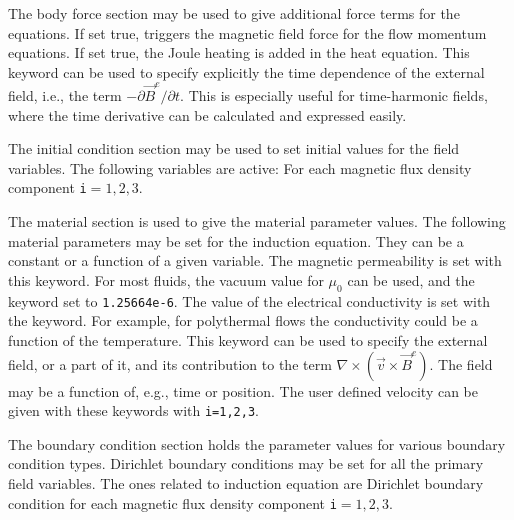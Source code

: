 The body force section may be used to give additional force terms for the equations.
\sifbegin
{} If set true, triggers the magnetic
field force for the flow momentum equations.
 If set true, the Joule heating is added in the
heat equation.
 This keyword can be used to specify
explicitly the time dependence of the external field, i.e., the term
$-\partial\vec{B}^e/\partial t$. This is especially useful for time-harmonic
fields, where the time derivative can be calculated and expressed easily.
\sifend

The initial condition section may be used to set initial values for the field
variables. The following variables are active:
\sifbegin
{} 
For each magnetic flux density component {\tt i}$=1,2,3$.
\sifend

The material section is used to give the material parameter values. The
following material parameters may be set for the induction equation. They can
be a constant or a function of a given variable.
\sifbegin
{} The magnetic permeability is set with
this keyword. For most fluids, the vacuum value for $\mu_0$ can be used,
and the keyword set to {\tt 1.25664e-6}.
 The value of the electrical
conductivity is set with the keyword. For example, for polythermal flows the
conductivity could be a function of the temperature.
 This keyword can be used to specify
the external field, or a part of it, and its contribution to the term
$\nabla\times(\vec{v}\times \vec{B}^e)$. The field may be a function of, e.g.,
time or position.
The user defined velocity can be given with these keywords with \texttt{i=1,2,3}.
\sifend

The boundary condition section holds the parameter values for various
boundary condition types. Dirichlet boundary conditions may be
set for all the primary field variables. The ones related to induction equation
are
\sifbegin
{} 
Dirichlet boundary condition
for each magnetic flux density component {\tt i}$=1,2,3$.
\sifend

\sifend


%
%
